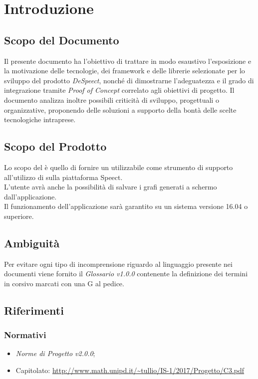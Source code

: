 \chapter{Introduzione}
\section{Scopo del Documento}
Il presente documento ha l'obiettivo di trattare in modo esaustivo l’esposizione e la motivazione delle tecnologie, dei framework e delle librerie selezionate per lo sviluppo del prodotto \textit{DeSpeect}, nonché di dimostrarne l'adeguatezza e il grado di integrazione tramite \textit{Proof of Concept} correlato agli obiettivi di progetto. Il documento analizza inoltre possibili criticità di sviluppo, progettuali o organizzative, proponendo delle soluzioni a supporto della bontà delle scelte tecnologiche intraprese. 

\section{Scopo del Prodotto}

Lo scopo del  è quello di fornire un  utilizzabile come strumento di supporto all'utilizzo di  sulla piattaforma Speect. 
\\ \noindent L'utente avrà anche la possibilità di salvare i grafi generati a schermo dall'applicazione.
\\ \noindent Il funzionamento dell'applicazione sarà garantito su un sistema  versione 16.04 o superiore.

\section{Ambiguità}
Per evitare ogni tipo di incomprensione riguardo al linguaggio presente nei documenti viene fornito il \textit{Glossario v1.0.0} contenente la definizione dei termini in corsivo marcati con una G al pedice.

\section{Riferimenti}
\subsection{Normativi}
\begin{itemize}
	\item \textit{Norme di Progetto v2.0.0};
	\item Capitolato: \url{http://www.math.unipd.it/~tullio/IS-1/2017/Progetto/C3.pdf}
\end{itemize}
